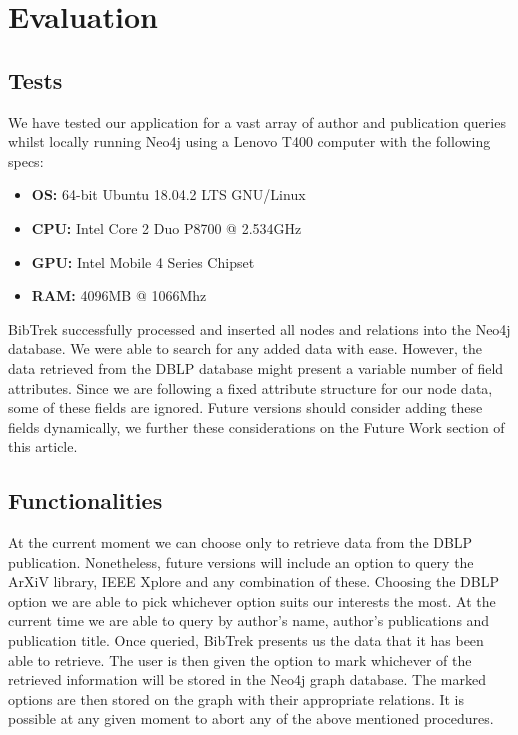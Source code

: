 \documentclass[twocolumn]{article}
\begin{document}
\section{Evaluation}
\subsection{Tests}
We have tested our application for a vast array of author and publication queries whilst locally running Neo4j using a Lenovo T400 computer with the following specs:
\begin{itemize}
\item \textbf{OS:} 64-bit Ubuntu 18.04.2 LTS GNU/Linux 
\item \textbf{CPU:} Intel Core 2 Duo P8700 @ 2.534GHz 
\item \textbf{GPU:} Intel Mobile 4 Series Chipset
\item \textbf{RAM:} 4096MB @ 1066Mhz 
\end{itemize}
BibTrek successfully processed and inserted all nodes and relations into the Neo4j database. We were able to search for any added data with ease. However, the data retrieved from the DBLP database might present a variable number of field attributes. Since we are following a fixed attribute structure for our node data, some of these fields are ignored. Future versions should consider adding these fields dynamically, we further these considerations on the Future Work section of this article.
\subsection{Functionalities}
At the current moment we can choose only to retrieve data from the DBLP publication. Nonetheless, future versions will include an option to query the ArXiV library, IEEE Xplore and any combination of these. Choosing the DBLP option we are able to pick whichever option suits our interests the most. At the current time we are able to query by author's name, author's publications and publication title. Once queried, BibTrek presents us the data that it has been able to retrieve. The user is then given the option to mark whichever of the retrieved information will be stored in the Neo4j graph database. The marked options are then stored on the graph with their appropriate relations. It is possible at any given moment to abort any of the above mentioned procedures.
\end{document}

